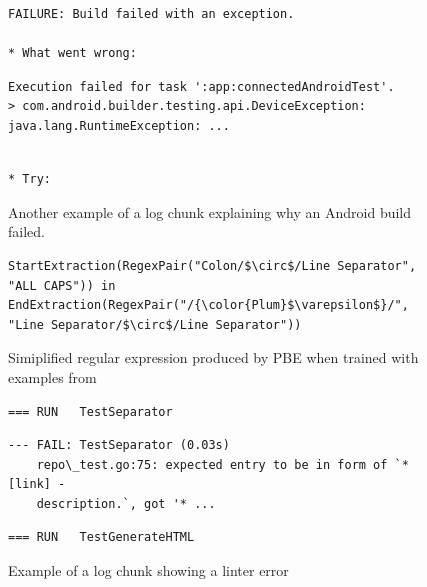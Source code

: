 \begin{figure}[!t]
  \centering
  \begin{lstlisting}[breaklines=true,frame=tlr]
FAILURE: Build failed with an exception.

* What went wrong:
  \end{lstlisting}
  \vspace{-\baselineskip}
  \begin{lstlisting}[backgroundcolor=\color{Cerulean!60},breaklines=true,frame=rl]
Execution failed for task ':app:connectedAndroidTest'.
> com.android.builder.testing.api.DeviceException:
java.lang.RuntimeException: ...
  \end{lstlisting}
  \vspace{-\baselineskip}
  \begin{lstlisting}[breaklines=true,frame=blr]

* Try:
  \end{lstlisting}
  \caption{Another example of a log chunk explaining why an Android
  build failed.}
  \label{lst:chunk-example-2}
\end{figure}

\begin{figure}[!t]
  \centering
  \begin{lstlisting}[breaklines=true]
StartExtraction(RegexPair("Colon/$\circ$/Line Separator",
"ALL CAPS")) in EndExtraction(RegexPair("/{\color{Plum}$\varepsilon$}/",
"Line Separator/$\circ$/Line Separator"))
  \end{lstlisting}
  \caption{Simiplified regular expression produced by PBE when trained
  with examples from }
  \label{lst:prose-program-simplified}
\end{figure}

\begin{figure}[!t]
  \centering
  \begin{lstlisting}[breaklines=true,frame=tlr]
=== RUN   TestSeparator
  \end{lstlisting}
  \vspace{-\baselineskip}
  \begin{lstlisting}[backgroundcolor=\color{Cerulean!60},breaklines=true,frame=rl]
--- FAIL: TestSeparator (0.03s)
    repo\_test.go:75: expected entry to be in form of `* [link] -
    description.`, got '* ...
  \end{lstlisting}
  \vspace{-\baselineskip}
  \begin{lstlisting}[breaklines=true,frame=blr]
=== RUN   TestGenerateHTML
  \end{lstlisting}
  \caption{Example of a log chunk showing a linter error}
  \label{lst:chunk-example-3}
\end{figure}

